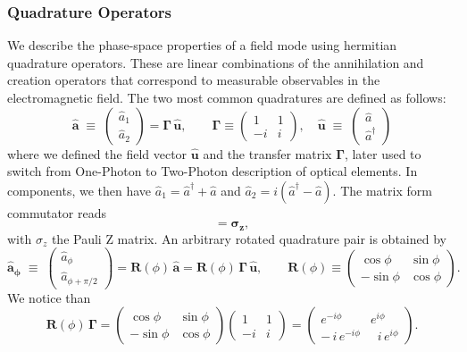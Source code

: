 \subsubsection{Quadrature Operators}
We describe the phase-space properties of a field mode using hermitian quadrature operators. These are linear combinations of the annihilation and creation operators that correspond to measurable observables in the electromagnetic field. The two most common quadratures are defined as follows:
\begin{equation}
\mathbf{\hat{a}}\;\equiv\;
\begin{pmatrix}\hat a_1\\[2pt]\hat a_2\end{pmatrix}
=\mathbf\Gamma \, \mathbf{\hat{u}}, \label{II.2}
\qquad
\mathbf \Gamma \equiv
\begin{pmatrix}
1 & 1 \\
-i & i
\end{pmatrix},
\quad
\mathbf{\hat{u}}\;\equiv\;
\begin{pmatrix}\hat a\\ \hat a^\dagger\end{pmatrix}
\end{equation}
where we defined the field vector $\mathbf{\hat{u}}$ and the transfer matrix $\mathbf \Gamma$, later used to switch from One-Photon to Two-Photon description of optical elements. In components, we then have $\hat a_1=\hat a^\dagger+\hat a$ and $\hat a_2=i(\hat a^\dagger-\hat a)$.
The matrix form commutator reads
\begin{equation}
[\mathbf{\hat{u}}, \mathbf{\hat{u}}^{\dagger}] = \mathbf{\sigma_z}, 
\end{equation}
with $\sigma_z$ the Pauli Z matrix. 
An arbitrary rotated quadrature pair is obtained by
\begin{equation}
\mathbf{\hat{a}_\phi}\;\equiv\;
\begin{pmatrix}\hat a_\phi\\[2pt]\hat a_{\phi+\pi/2}\end{pmatrix}
= \mathbf R(\phi)\,\mathbf{\hat{a}}
= \mathbf R(\phi)\,\mathbf\Gamma \,\mathbf{\hat{u}},
\qquad
 \mathbf R(\phi)\equiv
\begin{pmatrix}
\cos\phi & \sin\phi \\
-\sin\phi & \cos\phi \label{II.4}
\end{pmatrix}.
\end{equation}
We notice than 
\begin{equation}
\mathbf R(\phi)\,\boldsymbol{\Gamma}
=
\begin{pmatrix}
\cos\phi & \sin\phi \\
-\sin\phi & \cos\phi
\end{pmatrix}
\begin{pmatrix}
1 & 1 \\
-i & i
\end{pmatrix}
=
\begin{pmatrix}
e^{-i\phi} & e^{i\phi} \\[4pt]
-\,i\,e^{-i\phi} & \;\;i\,e^{i\phi}
\end{pmatrix}.
\end{equation}
